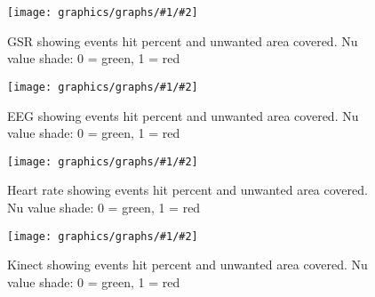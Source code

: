 \newcommand{\fuckinggraph}[4]{
    \begin{figure}[h!]
    \begin{minipage}[t]{0.5\textwidth}
        \texttt{[image: graphics/graphs/\#1/\#2]}
        \caption{#3}
        \label{#4}
    \end{minipage}
    \end{figure}
}

\newcommand{\fuckinggraphevenidontwanttorepeatmyself}[4]{ %
  \fuckinggraph{#1}
  {False_cover_rate_(FCR)-Events_hit_rate_(EHR)-CovNu-#2.pdf}{#3}{#4}
}

\fuckinggraphevenidontwanttorepeatmyself{short}{GSR}
{GSR showing events hit percent and unwanted area covered. Nu value shade: 0 = green, 1 = red}{fig:gsr_event_ehr}

\fuckinggraphevenidontwanttorepeatmyself{short}{EEG}
{EEG showing events hit percent and unwanted area covered. Nu value shade: 0 = green, 1 = red}{fig:eeg_event_ehr}

\fuckinggraphevenidontwanttorepeatmyself{short}{HR}
{Heart rate showing events hit percent and unwanted area covered. Nu value shade: 0 = green, 1 = red}{fig:hr_event_ehr}

\fuckinggraphevenidontwanttorepeatmyself{short}{FACE}
{Kinect showing events hit percent and unwanted area covered. Nu value shade: 0 = green, 1 = red}{fig:face_event_ehr}
